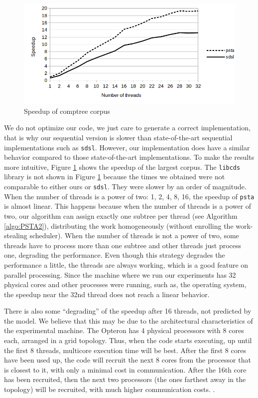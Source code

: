 \begin{figure}[ht]
  \centering
  \includegraphics[scale=0.3]{./images/Speedup.png}
  \caption{Speedup of comptree corpus}
  \label{fig:speedup} 
\end{figure}

We do not optimize our code, we just care to generate a correct
implementation, that is why our sequential version is slower than
state-of-the-art sequential implementations such as
\verb+sdsl+. However, our implementation does have a similar behavior
compared to those state-of-the-art implementations. To make the
results more intuitive, Figure \ref{fig:speedup} shows the speedup of
the largest corpus. The \verb+libcds+ library is not shown in Figure
\ref{fig:speedup} because the times we obtained were not comparable to
either ours or \verb+sdsl+. They were slower by an order of
magnitude. When the number of threads is a power of two: 1, 2, 4, 8,
16, the speedup of \verb+psta+ is almost linear. This happens because
when the number of threads is a power of two, our algorithm can assign
exactly one subtree per thread (see Algorithm \ref{algo:PSTA2}),
distributing the work homogeneously (without enrolling the
work-stealing scheduler). When the number of threads is not a power of
two, some threads have to process more than one subtree and other
threads just process one, degrading the performance. Even though this
strategy degrades the performance a little, the threads are always
working, which is a good feature on parallel processing. Since the
machine where we run our experiments has 32 physical cores and other
processes were running, such as, the operating system, the speedup
near the 32nd thread does not reach a linear behavior. 

There is also some ``degrading'' of the speedup after 16 threads, not
predicted by the model. We believe that this may be due to the
architectural characteristics of the experimental machine. The Opteron
has 4 physical processors with 8 cores each, arranged in a grid
topology\cite{Drepper2007}. Thus, when the code starts executing, up until
the first 8 threads, multicore execution time will be best. After the
first 8 cores have been used up, the code will recruit the next 8
cores from the processor that is closest to it, with only a minimal
cost in communication. After the 16th core has been recruited, then
the next two processors (the ones farthest away in the topology) will
be recruited, with much higher communication costs. .


